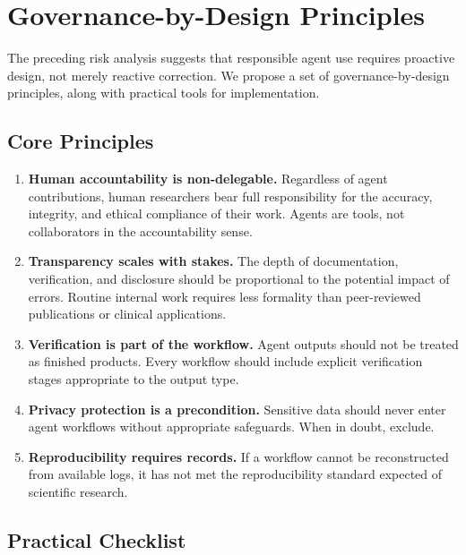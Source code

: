 \documentclass[11pt,letterpaper]{article}
\begin{document}
\section{Governance-by-Design Principles}
\label{sec:governance}

The preceding risk analysis suggests that responsible agent use requires proactive design, not merely reactive correction. We propose a set of governance-by-design principles, along with practical tools for implementation.

\subsection{Core Principles}

\begin{enumerate}[leftmargin=*]
    \item \textbf{Human accountability is non-delegable.} Regardless of agent contributions, human researchers bear full responsibility for the accuracy, integrity, and ethical compliance of their work. Agents are tools, not collaborators in the accountability sense.
    
    \item \textbf{Transparency scales with stakes.} The depth of documentation, verification, and disclosure should be proportional to the potential impact of errors. Routine internal work requires less formality than peer-reviewed publications or clinical applications.
    
    \item \textbf{Verification is part of the workflow.} Agent outputs should not be treated as finished products. Every workflow should include explicit verification stages appropriate to the output type.
    
    \item \textbf{Privacy protection is a precondition.} Sensitive data should never enter agent workflows without appropriate safeguards. When in doubt, exclude.
    
    \item \textbf{Reproducibility requires records.} If a workflow cannot be reconstructed from available logs, it has not met the reproducibility standard expected of scientific research.
\end{enumerate}

\subsection{Practical Checklist}
\end{document}

